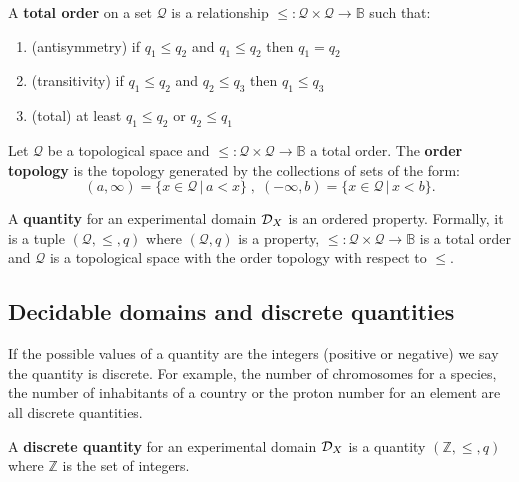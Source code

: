 \documentclass[11pt,letterpaper,fleqn]{memoir} %
\begin{document}
\begin{mathSection}
	\begin{defn}
		A \textbf{total order} on a set $\mathcal{Q}$ is a relationship $\leq : \mathcal{Q} \times \mathcal{Q} \to \mathbb{B}$ such that:
		\begin{enumerate}
			\item (antisymmetry) if $q_1 \leq q_2$ and $q_1 \leq q_2$ then $q_1 = q_2$
			\item (transitivity) if $q_1 \leq q_2$ and $q_2 \leq q_3$ then $q_1 \leq q_3$
			\item (total) at least $q_1 \leq q_2$ or $q_2 \leq q_1$
		\end{enumerate}
	\end{defn}
\begin{defn}
	Let $\mathcal{Q}$ be a topological space and $\leq : \mathcal{Q} \times \mathcal{Q} \to \mathbb{B}$ a total order. The \textbf{order topology} is the topology generated by the collections of sets of the form:
	$$(a, \infty) = \{x \in \mathcal{Q} \, | \, a < x\} \;,\; (-\infty, b) = \{x \in \mathcal{Q} \, | \, x < b\}.$$
\end{defn}
\begin{defn}
	A \textbf{quantity} for an experimental domain $\mathcal{D}_X$ is an ordered property. Formally, it is a tuple $(\mathcal{Q}, \leq, q)$ where $(\mathcal{Q}, q)$ is a property, $\leq : \mathcal{Q} \times \mathcal{Q} \to \mathbb{B}$ is a total order and $\mathcal{Q}$ is a topological space with the order topology with respect to $\leq$.
\end{defn}
\end{mathSection}

\subsection{Decidable domains and discrete quantities}

If the possible values of a quantity are the integers (positive or negative) we say the quantity is discrete. For example, the number of chromosomes for a species, the number of inhabitants of a country or the proton number for an element are all discrete quantities.

\begin{mathSection}
\begin{defn}
	A \textbf{discrete quantity} for an experimental domain $\mathcal{D}_X$ is a quantity $(\mathbb{Z}, \leq, q)$ where $\mathbb{Z}$ is the set of integers.
\end{defn}
\end{mathSection}
\end{document}
